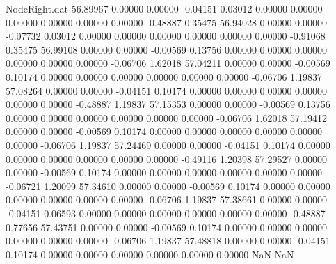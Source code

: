 \begin{filecontents}{NodeRight.dat}
  56.89967    0.00000    0.00000    -0.04151    0.03012    0.00000    0.00000    0.00000    0.00000    0.00000    0.00000   -0.48887    0.35475
  56.94028    0.00000    0.00000    -0.07732    0.03012    0.00000    0.00000    0.00000    0.00000    0.00000    0.00000   -0.91068    0.35475
  56.99108    0.00000    0.00000    -0.00569    0.13756    0.00000    0.00000    0.00000    0.00000    0.00000    0.00000   -0.06706    1.62018
  57.04211    0.00000    0.00000    -0.00569    0.10174    0.00000    0.00000    0.00000    0.00000    0.00000    0.00000   -0.06706    1.19837
  57.08264    0.00000    0.00000    -0.04151    0.10174    0.00000    0.00000    0.00000    0.00000    0.00000    0.00000   -0.48887    1.19837
  57.15353    0.00000    0.00000    -0.00569    0.13756    0.00000    0.00000    0.00000    0.00000    0.00000    0.00000   -0.06706    1.62018
  57.19412    0.00000    0.00000    -0.00569    0.10174    0.00000    0.00000    0.00000    0.00000    0.00000    0.00000   -0.06706    1.19837
  57.24469    0.00000    0.00000    -0.04151    0.10174    0.00000    0.00000    0.00000    0.00000    0.00000    0.00000   -0.49116    1.20398
  57.29527    0.00000    0.00000    -0.00569    0.10174    0.00000    0.00000    0.00000    0.00000    0.00000    0.00000   -0.06721    1.20099
  57.34610    0.00000    0.00000    -0.00569    0.10174    0.00000    0.00000    0.00000    0.00000    0.00000    0.00000   -0.06706    1.19837
  57.38661    0.00000    0.00000    -0.04151    0.06593    0.00000    0.00000    0.00000    0.00000    0.00000    0.00000   -0.48887    0.77656
  57.43751    0.00000    0.00000    -0.00569    0.10174    0.00000    0.00000    0.00000    0.00000    0.00000    0.00000   -0.06706    1.19837
  57.48818    0.00000    0.00000    -0.04151    0.10174    0.00000    0.00000    0.00000    0.00000    0.00000    0.00000        NaN        NaN
\end{filecontents}
